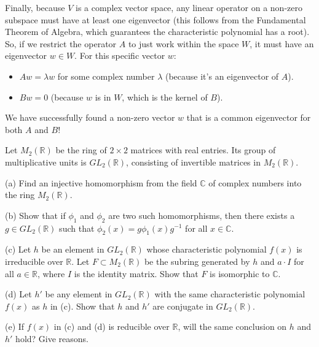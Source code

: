 \begin{solution}
Finally, because $V$ is a complex vector space, any linear operator on a non-zero subspace must have at least one eigenvector (this follows from the Fundamental Theorem of Algebra, which guarantees the characteristic polynomial has a root). 
So, if we restrict the operator $A$ to just work within the space $W$, it must have an eigenvector $w \in W$.
For this specific vector $w$:
\begin{itemize}
    \item $Aw = \lambda w$ for some complex number $\lambda$ (because it's an eigenvector of $A$).
    \item $Bw = 0$ (because $w$ is in $W$, which is the kernel of $B$).
\end{itemize}
We have successfully found a non-zero vector $w$ that is a common eigenvector for both $A$ and $B$!
\end{solution}

\begin{exercise}
\label{algebra:2010:2}
Let $M_2(\mathbb{R})$ be the ring of $2 \times 2$ matrices with real entries. Its group of multiplicative units is $GL_2(\mathbb{R})$, consisting of invertible matrices in $M_2(\mathbb{R})$.

(a) Find an injective homomorphism from the field $\mathbb{C}$ of complex numbers into the ring $M_2(\mathbb{R})$.

(b) Show that if $\phi_1$ and $\phi_2$ are two such homomorphisms, then there exists a $g \in GL_2(\mathbb{R})$ such that $\phi_2(x) = g\phi_1(x)g^{-1}$ for all $x \in \mathbb{C}$.

(c) Let $h$ be an element in $GL_2(\mathbb{R})$ whose characteristic polynomial $f(x)$ is irreducible over $\mathbb{R}$. Let $F \subset M_2(\mathbb{R})$ be the subring generated by $h$ and $a \cdot I$ for all $a \in \mathbb{R}$, where $I$ is the identity matrix. Show that $F$ is isomorphic to $\mathbb{C}$.

(d) Let $h'$ be any element in $GL_2(\mathbb{R})$ with the same characteristic polynomial $f(x)$ as $h$ in (c). Show that $h$ and $h'$ are conjugate in $GL_2(\mathbb{R})$.

(e) If $f(x)$ in (c) and (d) is reducible over $\mathbb{R}$, will the same conclusion on $h$ and $h'$ hold? Give reasons.
\end{exercise}

